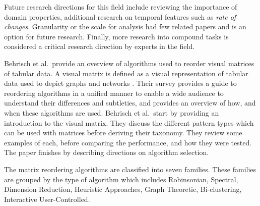 Future research directions for this field include reviewing the importance of domain properties, additional research on temporal features such as \textit{rate of changes}. Granularity or the scale for analysis had few related papers and is an option for future research. Finally, more research into compound tasks is considered a critical research direction by experts in the field.


Behrisch et al.\ provide an overview of algorithms used to reorder visual matrices of tabular data. A visual matrix is defined as a visual representation of tabular data used to depict graphs and networks \cite{behrisch2016matrix}. Their survey provides a guide to reordering algorithms in a unified manner to enable a wide audience to understand their differences and subtleties, and provides an overview of how, and when these algorithms are used.
Behrisch et al.\ start by providing an introduction to the visual matrix. They discuss the different pattern types which can be used with matrices before deriving their taxonomy. They review some examples of each, before comparing the performance, and how they were tested. The paper finishes by describing directions on algorithm selection. 

The matrix reordering algorithms are classified into seven families. These families are grouped by the type of algorithm which includes Robinsonian, Spectral, Dimension Reduction, Heuristic Approaches, Graph Theoretic, Bi-clustering, Interactive User-Controlled.


